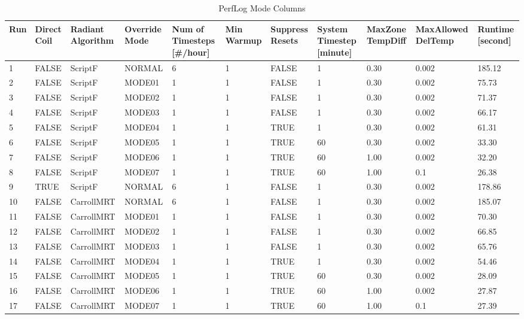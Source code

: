 {\scriptsize
\begin{longtable}[c]{p{0.2in}p{0.4in}p{0.55in}p{0.5in}p{0.52in}p{0.4in}p{0.5in}p{0.5in}p{0.5in}p{0.6in}p{0.5in}}
\caption{PerfLog Mode Columns\label{table:perflog_mode_columns}} \tabularnewline
\toprule
Run & 
Direct Coil & 
Radiant Algorithm & 
Override Mode & 
Num of Timesteps {[}\#/hour{]}& 
Min Warmup& 
Suppress Resets & 
System Timestep {[}minute{]} &
MaxZone TempDiff & 
MaxAllowed DelTemp &
Runtime {[}second{]} \tabularnewline
\midrule
\endfirsthead

1  & FALSE & ScriptF    & NORMAL & 6 & 1 & FALSE & 1  & 0.30 & 0.002 & 185.12 \tabularnewline
2  & FALSE & ScriptF    & MODE01 & 1 & 1 & FALSE & 1  & 0.30 & 0.002 & 75.73  \tabularnewline
3  & FALSE & ScriptF    & MODE02 & 1 & 1 & FALSE & 1  & 0.30 & 0.002 & 71.37  \tabularnewline
4  & FALSE & ScriptF    & MODE03 & 1 & 1 & FALSE & 1  & 0.30 & 0.002 & 66.17  \tabularnewline
5  & FALSE & ScriptF    & MODE04 & 1 & 1 & TRUE  & 1  & 0.30 & 0.002 & 61.31  \tabularnewline
6  & FALSE & ScriptF    & MODE05 & 1 & 1 & TRUE  & 60 & 0.30 & 0.002 & 33.30  \tabularnewline
7  & FALSE & ScriptF    & MODE06 & 1 & 1 & TRUE  & 60 & 1.00 & 0.002 & 32.20  \tabularnewline
8  & FALSE & ScriptF    & MODE07 & 1 & 1 & TRUE  & 60 & 1.00 & 0.1   & 26.38  \tabularnewline
9  & TRUE  & ScriptF    & NORMAL & 6 & 1 & FALSE & 1  & 0.30 & 0.002 & 178.86 \tabularnewline
10 & FALSE & CarrollMRT & NORMAL & 6 & 1 & FALSE & 1  & 0.30 & 0.002 & 185.07 \tabularnewline
11 & FALSE & CarrollMRT & MODE01 & 1 & 1 & FALSE & 1  & 0.30 & 0.002 & 70.30  \tabularnewline
12 & FALSE & CarrollMRT & MODE02 & 1 & 1 & FALSE & 1  & 0.30 & 0.002 & 66.85  \tabularnewline
13 & FALSE & CarrollMRT & MODE03 & 1 & 1 & FALSE & 1  & 0.30 & 0.002 & 65.76  \tabularnewline
14 & FALSE & CarrollMRT & MODE04 & 1 & 1 & TRUE  & 1  & 0.30 & 0.002 & 54.46  \tabularnewline
15 & FALSE & CarrollMRT & MODE05 & 1 & 1 & TRUE  & 60 & 0.30 & 0.002 & 28.09  \tabularnewline
16 & FALSE & CarrollMRT & MODE06 & 1 & 1 & TRUE  & 60 & 1.00 & 0.002 & 27.87  \tabularnewline
17 & FALSE & CarrollMRT & MODE07 & 1 & 1 & TRUE  & 60 & 1.00 & 0.1   & 27.39  \tabularnewline

\bottomrule
\end{longtable}
}

